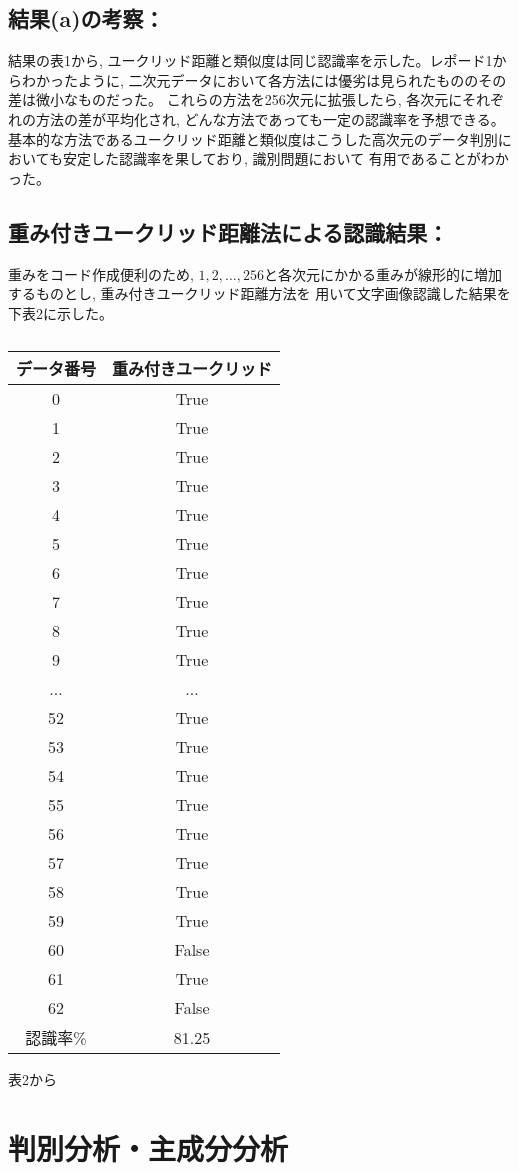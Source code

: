\documentclass[twocolumn, 10.5pt]{jsarticle}
\begin{document}
\subsection{結果(a)の考察：}
結果の表1から, ユークリッド距離と類似度は同じ認識率を示した。レポード1からわかったように,
二次元データにおいて各方法には優劣は見られたもののその差は微小なものだった。
これらの方法を256次元に拡張したら, 各次元にそれぞれの方法の差が平均化され, どんな方法であっても一定の認識率を予想できる。
基本的な方法であるユークリッド距離と類似度はこうした高次元のデータ判別においても安定した認識率を果しており, 識別問題において
有用であることがわかった。

\subsection{重み付きユークリッド距離法による認識結果：}
重みをコード作成便利のため, $1, 2, ..., 256$と各次元にかかる重みが線形的に増加するものとし, 重み付きユークリッド距離方法を
用いて文字画像認識した結果を下表2に示した。

\begin{table}[htbp]
  \caption{}
  \centering
  \begin{tabular}{|c||c|}\hline
    データ番号 & 重み付きユークリッド \\\hline\hline
    0 & True \\\hline
    1 & True \\\hline
    2 & True \\\hline
    3 & True \\\hline
    4 & True \\\hline
    5 & True \\\hline
    6 & True \\\hline
    7 & True \\\hline
    8 & True \\\hline
    9 & True \\\hline
    ... & ... \\\hline
    52 & True \\\hline
    53 & True \\\hline
    54 & True \\\hline
    55 & True \\\hline
    56 & True \\\hline
    57 & True \\\hline
    58 & True \\\hline
    59 & True \\\hline
    60 & False \\\hline
    61 & True \\\hline
    62 & False \\\hline
    認識率\% & 81.25 \\\hline
  \end{tabular}
\end{table}

表2から


\section{判別分析・主成分分析}
\end{document}
